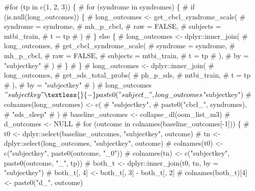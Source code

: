 \documentclass[
  letterpaper,
  DIV=11,
  numbers=noendperiod]{scrreprt}
\newenvironment{Shaded}{\begin{snugshade}}{\end{snugshade}}
\newcommand{\CommentTok}[1]{\textcolor[rgb]{0.37,0.37,0.37}{#1}}
\begin{document}
\begin{Shaded}
\begin{Highlighting}[]
\CommentTok{\#for (tp in c(1, 2, 3)) \{}
\CommentTok{\#    for (syndrome in syndromes) \{}
\CommentTok{\#        if (is.null(long\_outcomes)) \{}
\CommentTok{\#            long\_outcomes \textless{}{-} get\_cbcl\_syndrome\_scale(}
\CommentTok{\#                syndrome = syndrome,}
\CommentTok{\#                mh\_p\_cbcl,}
\CommentTok{\#                raw = FALSE,}
\CommentTok{\#                subjects = mtbi\_train,}
\CommentTok{\#                t = tp}
\CommentTok{\#            )}
\CommentTok{\#        \} else \{}
\CommentTok{\#            long\_outcomes \textless{}{-} dplyr::inner\_join(}
\CommentTok{\#                long\_outcomes,}
\CommentTok{\#                get\_cbcl\_syndrome\_scale(}
\CommentTok{\#                    syndrome = syndrome,}
\CommentTok{\#                    mh\_p\_cbcl,}
\CommentTok{\#                    raw = FALSE,}
\CommentTok{\#                    subjects = mtbi\_train,}
\CommentTok{\#                    t = tp}
\CommentTok{\#                ),}
\CommentTok{\#                by = "subjectkey"}
\CommentTok{\#            )}
\CommentTok{\#        \}}
\CommentTok{\#    \}}
\CommentTok{\#    long\_outcomes \textless{}{-} dplyr::inner\_join(}
\CommentTok{\#        long\_outcomes,}
\CommentTok{\#        get\_sds\_total\_probs(}
\CommentTok{\#            ph\_p\_sds,}
\CommentTok{\#            mtbi\_train,}
\CommentTok{\#            t = tp}
\CommentTok{\#        ),}
\CommentTok{\#        by = "subjectkey"}
\CommentTok{\#    )}
\CommentTok{\#    long\_outcomes$"subjectkey" \textless{}{-} paste0("subject\_", long\_outcomes$"subjectkey")}
\CommentTok{\#    colnames(long\_outcomes) \textless{}{-} c(}
\CommentTok{\#        "subjectkey",}
\CommentTok{\#        paste0("cbcl\_", syndromes),}
\CommentTok{\#        "sds\_sleep"}
\CommentTok{\#    )}
\CommentTok{\#    baseline\_outcomes \textless{}{-} collapse\_dl(oom\_list\_m3)}
\CommentTok{\#    d\_outcomes \textless{}{-} NULL}
\CommentTok{\#    for (outcome in colnames(baseline\_outcomes[{-}1])) \{}
\CommentTok{\#        t0 \textless{}{-} dplyr::select(baseline\_outcomes, "subjectkey", outcome)}
\CommentTok{\#        tn \textless{}{-} dplyr::select(long\_outcomes, "subjectkey", outcome)}
\CommentTok{\#        colnames(t0) \textless{}{-} c("subjectkey", paste0(outcome, "\_0"))}
\CommentTok{\#        colnames(tn) \textless{}{-} c("subjectkey", paste0(outcome, "\_", tp))}
\CommentTok{\#        both\_t \textless{}{-} dplyr::inner\_join(t0, tn, by = "subjectkey")}
\CommentTok{\#        both\_t[, 4] \textless{}{-} both\_t[, 3] {-} both\_t[, 2]}
\CommentTok{\#        colnames(both\_t)[4] \textless{}{-} paste0("d\_", outcome)}

\end{Highlighting}
\end{Shaded}
\end{document}

